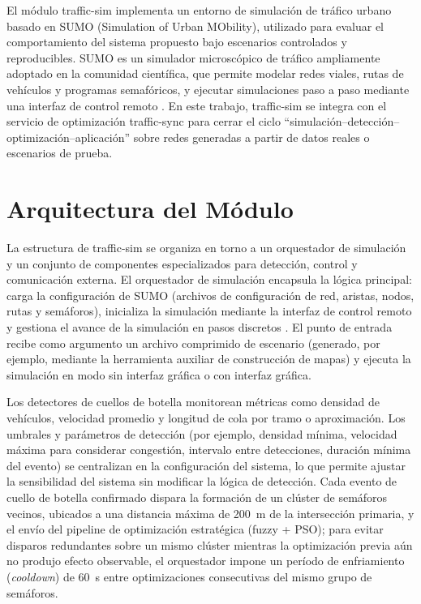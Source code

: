 \label{sec:traffic_sim}

El módulo traffic-sim implementa un entorno de simulación de tráfico urbano basado en SUMO (Simulation of Urban MObility), utilizado para evaluar el comportamiento del sistema propuesto bajo escenarios controlados y reproducibles. SUMO es un simulador microscópico de tráfico ampliamente adoptado en la comunidad científica, que permite modelar redes viales, rutas de vehículos y programas semafóricos, y ejecutar simulaciones paso a paso mediante una interfaz de control remoto \cite{sumo2025manual}. En este trabajo, traffic-sim se integra con el servicio de optimización traffic-sync para cerrar el ciclo “simulación–detección–optimización–aplicación” sobre redes generadas a partir de datos reales o escenarios de prueba.

\section{Arquitectura del Módulo}
\label{subsec:traffic_sim_architecture}

La estructura de traffic-sim se organiza en torno a un orquestador de simulación y un conjunto de componentes especializados para detección, control y comunicación externa. El orquestador de simulación encapsula la lógica principal: carga la configuración de SUMO (archivos de configuración de red, aristas, nodos, rutas y semáforos), inicializa la simulación mediante la interfaz de control remoto y gestiona el avance de la simulación en pasos discretos \cite{sumo2025manual}. El punto de entrada recibe como argumento un archivo comprimido de escenario (generado, por ejemplo, mediante la herramienta auxiliar de construcción de mapas) y ejecuta la simulación en modo sin interfaz gráfica o con interfaz gráfica.

Los detectores de cuellos de botella monitorean métricas como densidad de vehículos, velocidad promedio y longitud de cola por tramo o aproximación. Los umbrales y parámetros de detección (por ejemplo, densidad mínima, velocidad máxima para considerar congestión, intervalo entre detecciones, duración mínima del evento) se centralizan en la configuración del sistema, lo que permite ajustar la sensibilidad del sistema sin modificar la lógica de detección. Cada evento de cuello de botella confirmado dispara la formación de un clúster de semáforos vecinos, ubicados a una distancia máxima de 200~m de la intersección primaria, y el envío del pipeline de optimización estratégica (fuzzy + PSO); para evitar disparos redundantes sobre un mismo clúster mientras la optimización previa aún no produjo efecto observable, el orquestador impone un período de enfriamiento (\emph{cooldown}) de 60~s entre optimizaciones consecutivas del mismo grupo de semáforos.

